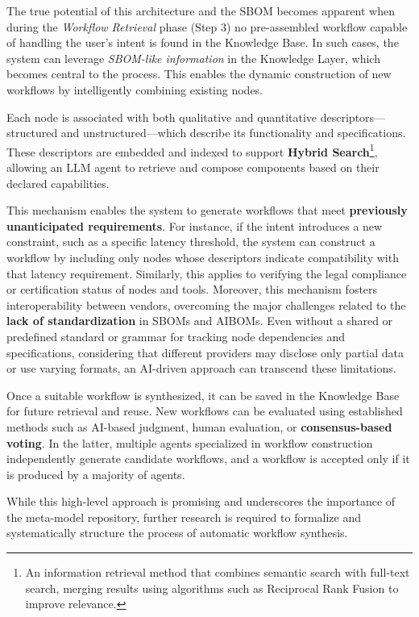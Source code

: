The true potential of this architecture and the SBOM becomes apparent when during the \textit{Workflow Retrieval} phase (Step 3) no pre-assembled workflow capable of handling the user’s intent is found in the Knowledge Base. In such cases, the system can leverage \textit{SBOM-like information} in the Knowledge Layer, which becomes central to the process. This enables the dynamic construction of new workflows by intelligently combining existing nodes. 

Each node is associated with both qualitative and quantitative descriptors—structured and unstructured—which describe its functionality and specifications. These descriptors are embedded and indexed to support \textbf{Hybrid Search}\footnote{An information retrieval method that combines semantic search with full-text search, merging results using algorithms such as Reciprocal Rank Fusion to improve relevance.}, allowing an LLM agent to retrieve and compose components based on their declared capabilities.

This mechanism enables the system to generate workflows that meet \textbf{previously unanticipated requirements}. For instance, if the intent introduces a new constraint, such as a specific latency threshold, the system can construct a workflow by including only nodes whose descriptors indicate compatibility with that latency requirement. Similarly, this applies to verifying the legal compliance or certification status of nodes and tools. Moreover, this mechanism fosters interoperability between vendors, overcoming the major challenges related to the \textbf{lack of standardization} in SBOMs and AIBOMs. Even without a shared or predefined standard or grammar for tracking node dependencies and specifications, considering that different providers may disclose only partial data or use varying formats, an AI-driven approach can transcend these limitations.





Once a suitable workflow is synthesized, it can be saved in the Knowledge Base for future retrieval and reuse. New workflows can be evaluated using established methods such as AI-based judgment, human evaluation, or \textbf{consensus-based voting}. In the latter, multiple agents specialized in workflow construction independently generate candidate workflows, and a workflow is accepted only if it is produced by a majority of agents.

While this high-level approach is promising and underscores the importance of the meta-model repository, further research is required to formalize and systematically structure the process of automatic workflow synthesis.












